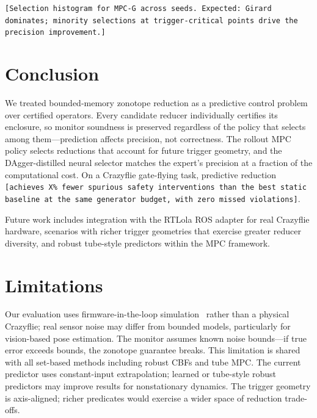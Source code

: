 \documentclass{article}
\newcommand{\placeholder}[1]{\texttt{[#1]}}
\begin{document}
\placeholder{Selection histogram for MPC-G across seeds. Expected: Girard dominates; minority selections at trigger-critical points drive the precision improvement.}

\section{Conclusion}\label{sec:conclusion}

We treated bounded-memory zonotope reduction as a predictive control problem over certified operators.
Every candidate reducer individually certifies its enclosure, so monitor soundness is preserved regardless of the policy that selects among them---prediction affects precision, not correctness.
The rollout MPC policy selects reductions that account for future trigger geometry, and the DAgger-distilled neural selector matches the expert's precision at a fraction of the computational cost.
On a Crazyflie gate-flying task, predictive reduction \placeholder{achieves X\% fewer spurious safety interventions than the best static baseline at the same generator budget, with zero missed violations}.

Future work includes integration with the RTLola ROS adapter for real Crazyflie hardware, scenarios with richer trigger geometries that exercise greater reducer diversity, and robust tube-style predictors within the MPC framework.

\section{Limitations}\label{sec:limitations}

Our evaluation uses firmware-in-the-loop simulation~\cite{Panerati2021} rather than a physical Crazyflie; real sensor noise may differ from bounded models, particularly for vision-based pose estimation.
The monitor assumes known noise bounds---if true error exceeds bounds, the zonotope guarantee breaks. This limitation is shared with all set-based methods including robust CBFs and tube MPC.
The current predictor uses constant-input extrapolation; learned or tube-style robust predictors may improve results for nonstationary dynamics.
The trigger geometry is axis-aligned; richer predicates would exercise a wider space of reduction trade-offs.



\end{document}
